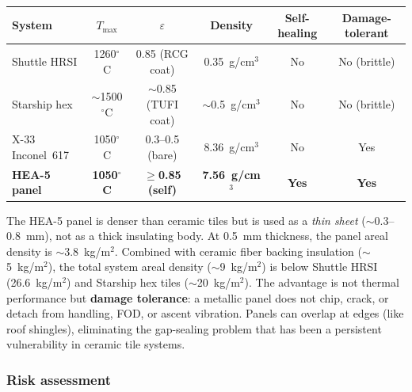 \documentclass[12pt,letterpaper]{article}
\theoremstyle{definition}
\begin{document}
\begin{center}
\small
\begin{tabular}{@{}lccccc@{}}
\toprule
System & $T_{\max}$ & $\varepsilon$ & Density & Self-healing & Damage-tolerant \\
\midrule
Shuttle HRSI & 1260$^\circ$C & 0.85 (RCG coat) & 0.35~g/cm$^3$ & No & No (brittle) \\
Starship hex & $\sim$1500$^\circ$C & $\sim$0.85 (TUFI coat) & $\sim$0.5~g/cm$^3$ & No & No (brittle) \\
X-33 Inconel~617 & 1050$^\circ$C & 0.3--0.5 (bare) & 8.36~g/cm$^3$ & No & Yes \\
\textbf{HEA-5 panel} & \textbf{1050$^\circ$C} & $\boldsymbol{\geq}$\textbf{0.85 (self)} & \textbf{7.56~g/cm$^3$} & \textbf{Yes} & \textbf{Yes} \\
\bottomrule
\end{tabular}
\normalsize
\end{center}

The HEA-5 panel is denser than ceramic tiles but is used as a \emph{thin sheet} ($\sim$0.3--0.8~mm), not as a thick insulating body.  At 0.5~mm thickness, the panel areal density is $\sim$3.8~kg/m$^2$.  Combined with ceramic fiber backing insulation ($\sim$5~kg/m$^2$), the total system areal density ($\sim$9~kg/m$^2$) is below Shuttle HRSI (26.6~kg/m$^2$) and Starship hex tiles ($\sim$20~kg/m$^2$).  The advantage is not thermal performance but \textbf{damage tolerance}: a metallic panel does not chip, crack, or detach from handling, FOD, or ascent vibration.  Panels can overlap at edges (like roof shingles), eliminating the gap-sealing problem that has been a persistent vulnerability in ceramic tile systems.

\subsubsection{Risk assessment}
\end{document}
